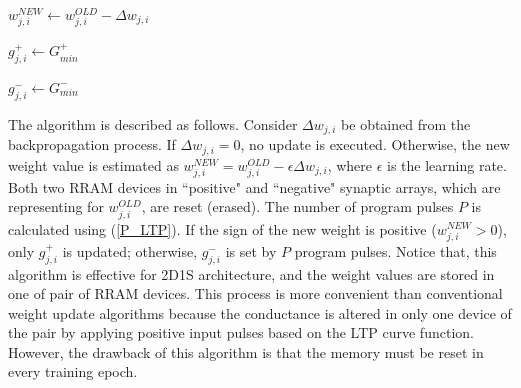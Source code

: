 \documentclass[journal]{IEEEtran}
\DeclarePairedDelimiter{\nint}\lfloor\rceil
\begin{document}

\begin{algorithm} [hbt!]
\caption{Weight update algorithm}\label{alg:one}

$w^{NEW}_{j,i} \gets w^{OLD}_{j,i} - \Delta w_{j,i}$ \;

 {
    $g^{+}_{j,i} \gets G^+_{min} $ 
    }

 {
    $g^{-}_{j,i} \gets G^-_{min}$ 
    }
\end{algorithm}

The algorithm is described as follows. Consider $\Delta w_{j,i}$ be obtained from the backpropagation process. If $\Delta w_{j,i}=0$, no update is executed. Otherwise, the new weight value is estimated as $w^{NEW}_{j,i}=w^{OLD}_{j,i}-\epsilon\Delta w_{j,i}$, where $\epsilon$ is the learning rate. Both two RRAM devices in ``positive" and ``negative" synaptic arrays, which are representing for $w^{OLD}_{j,i}$, are reset (erased). The number of program pulses $P$ is calculated using (\ref{P_LTP}). If the sign of the new weight is positive ($w^{NEW}_{j,i}>0$), only $g^{+}_{j,i}$ is updated; otherwise, $g^{-}_{j,i}$ is set by $P$ program pulses. Notice that, this algorithm is effective for 2D1S architecture, and the weight values are stored in one of pair of RRAM devices. This process is more convenient than conventional weight update algorithms because the conductance is altered in only one device of the pair by applying positive input pulses based on the LTP curve function. However, the drawback of this algorithm is that the memory must be reset in every training epoch.
 
\end{document}
